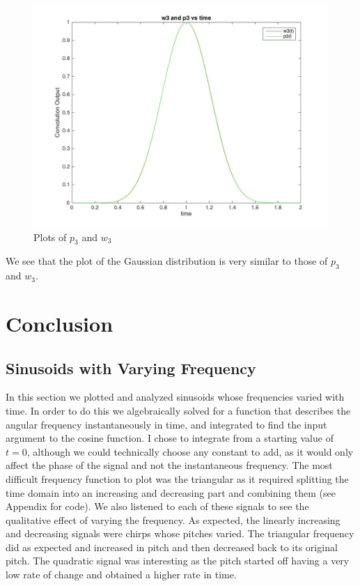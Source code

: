 \documentclass{article}
\begin{document}
\begin{figure}[!htb]
    \centering
        \includegraphics[scale = 0.25]{part3compare.jpg}
        \caption{Plots of $p_3$ and $w_3$ }
\end{figure}



\FloatBarrier
We see that the plot of the Gaussian distribution is very similar to those of $p_3$ and $w_3$.

\FloatBarrier
\section{Conclusion}
\subsection{Sinusoids with Varying Frequency}
In this section we plotted and analyzed sinusoids whose frequencies varied with time. In order to do this we algebraically solved for a function that describes the angular frequency instantaneously in time, and integrated to find the input argument to the cosine function. I chose to integrate from a starting value of $t = 0$, although we could technically choose any constant to add, as it would only affect the phase of the signal and not the instantaneous frequency. The most difficult frequency function to plot was the triangular as it required splitting the time domain into an increasing and decreasing part and combining them (see Appendix for code). We also listened to each of these signals to see the qualitative effect of varying the frequency. As expected, the linearly increasing and decreasing signals were chirps whose pitches varied. The triangular frequency did as expected and increased in pitch and then decreased back to its original pitch. The quadratic signal was interesting as the pitch started off having a very low rate of change and obtained a higher rate in time.
\end{document}
